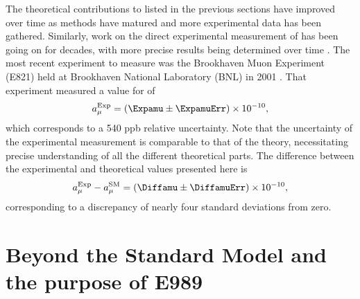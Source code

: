 The theoretical contributions to \amu listed in the previous sections have improved over time as methods have matured and more experimental data has been gathered. Similarly, work on the direct experimental measurement of \amu has been going on for decades, with more precise results being determined over time \cite{PastExperiments}. The most recent experiment to measure \gmtwo was the Brookhaven Muon \gmtwo Experiment (E821) held at Brookhaven National Laboratory (BNL) in 2001 . That experiment measured a value for \amu of \cite{E821FinalReport,CODATA}
		\begin{align}
            a_{\mu}^{\text{Exp}} = (\Expamu \pm \ExpamuErr) \times 10^{-10},
		\end{align}
which corresponds to a 540 ppb relative uncertainty. Note that the uncertainty of the experimental measurement is comparable to that of the theory, necessitating precise understanding of all the different theoretical parts. The difference between the experimental and theoretical values presented here is
		\begin{align}
            a_{\mu}^{\text{Exp}} - a_{\mu}^{\text{SM}} = (\Diffamu \pm \DiffamuErr) \times 10^{-10},
		\end{align}
corresponding to a discrepancy of nearly four standard deviations from zero.



\section{Beyond the Standard Model and the purpose of E989}
\label{sec:BSM}



